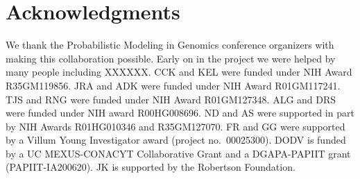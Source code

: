 \documentclass[12pt,halfline,a4paper]{ouparticle}
\begin{document}

\section*{Acknowledgments}
We thank the Probabilistic Modeling in Genomics conference organizers with making this collaboration possible.
Early on in the project we were helped by many people including XXXXXX.
CCK and KEL were funded under NIH Award R35GM119856.
JRA and ADK were funded under NIH Award R01GM117241.
TJS and RNG were funded under NIH Award R01GM127348.
ALG and DRS were funded under NIH award R00HG008696.
ND and AS were supported in part by NIH Awards R01HG010346 and R35GM127070.
FR and GG were supported by a Villum Young Investigator award (project no.~00025300).
DODV is funded by a UC MEXUS-CONACYT Collaborative Grant and a DGAPA-PAPIIT grant (PAPIIT-IA200620).
JK is supported by the Robertson Foundation.
\end{document}
